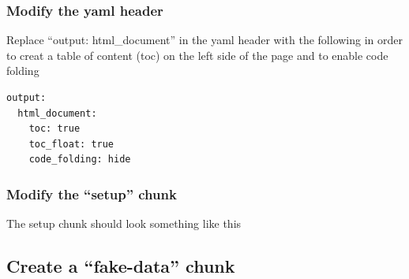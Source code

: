\documentclass[]{book}
\newenvironment{Shaded}{\begin{snugshade}}{\end{snugshade}}
\newcommand{\CommentTok}[1]{\textcolor[rgb]{0.56,0.35,0.01}{\textit{#1}}}
\newcommand{\DataTypeTok}[1]{\textcolor[rgb]{0.13,0.29,0.53}{#1}}
\newcommand{\KeywordTok}[1]{\textcolor[rgb]{0.13,0.29,0.53}{\textbf{#1}}}
\newcommand{\NormalTok}[1]{#1}
\newcommand{\OperatorTok}[1]{\textcolor[rgb]{0.81,0.36,0.00}{\textbf{#1}}}
\newcommand{\OtherTok}[1]{\textcolor[rgb]{0.56,0.35,0.01}{#1}}
\newcommand{\StringTok}[1]{\textcolor[rgb]{0.31,0.60,0.02}{#1}}
\begin{document}
\hypertarget{modify-the-yaml-header}{%
\subsubsection{Modify the yaml header}\label{modify-the-yaml-header}}

Replace ``output: html\_document'' in the yaml header with the following in order to creat a table of content (toc) on the left side of the page and to enable code folding

\begin{verbatim}
output:
  html_document:
    toc: true
    toc_float: true
    code_folding: hide
\end{verbatim}

\hypertarget{modify-the-setup-chunk}{%
\subsubsection{Modify the ``setup'' chunk}\label{modify-the-setup-chunk}}

The setup chunk should look something like this

\begin{Shaded}
\end{Shaded}

\hypertarget{create-a-fake-data-chunk}{%
\subsection{Create a ``fake-data'' chunk}\label{create-a-fake-data-chunk}}
\end{document}

